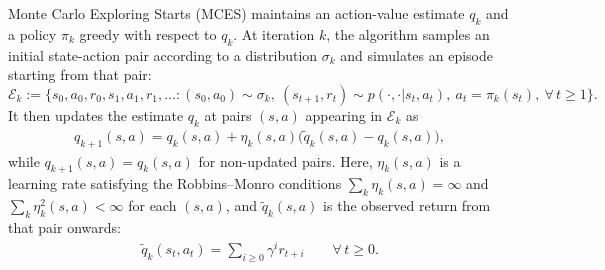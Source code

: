 \documentclass{article}
\begin{document}
Monte Carlo Exploring Starts (MCES) maintains an action-value estimate $q_k$
and a policy $\pi_k$ greedy with respect to $q_k$.
At iteration $k$, the algorithm samples an initial state-action pair according to a distribution $\sigma_k$
and simulates an episode starting from that pair:
\[
\mathcal E_k
:=
\bigg\{
s_0,a_0,r_0,s_1,a_1,r_1,\ldots : 
(s_0,a_0) \sim \sigma_k, \
(s_{t+1},r_t) \sim p(\cdot, \cdot| s_t, a_t), \
a_t = \pi_k(s_t), \
\forall \, t \ge 1
\bigg\} .
\]
It then updates the estimate $q_k$ at pairs $(s,a)$ appearing in $\mathcal E_k$ as
\begin{align}
\label{eq: mcopi def}
q_{k+1}(s,a) = q_k(s,a) + \eta_k(s,a) \big( \tilde q_k(s,a) - q_k(s,a) \big) ,
\end{align}
while \(q_{k+1}(s,a) = q_k(s,a)\) for non-updated pairs.
Here,
$\eta_k(s,a)$ is a learning rate satisfying the Robbins--Monro conditions $\sum_{k} \eta_k(s,a) = \infty$ and $\sum_{k} \eta_k^2(s,a) < \infty$ for each $(s,a)$,
and
$\tilde q_k(s,a)$ is the observed return from that pair onwards:
\begin{align}
\label{eq: episode return}
\tilde q_k(s_t,a_t) = \sum_{i \geq 0} \gamma^{i} r_{t+i} 
\qquad
\forall \, t \ge 0 .
\end{align}
% 
% 
% 
\end{document}
